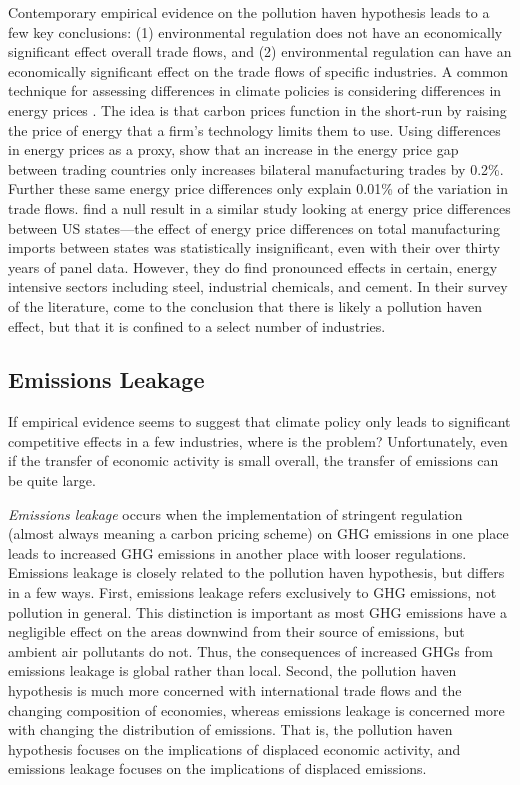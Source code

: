 Contemporary empirical evidence on the pollution haven hypothesis leads to a few key conclusions: (1) environmental regulation does not have an economically significant effect overall trade flows, and (2) environmental regulation can have an economically significant effect on the trade flows of specific industries. A common technique for assessing differences in climate policies is considering differences in energy prices \citep[see for example][]{fowlie2022mitigating}. The idea is that carbon prices function in the short-run by raising the price of energy that a firm's technology limits them to use. Using differences in energy prices as a proxy, \cite{sato2015asymmetric} show that an increase in the energy price gap between trading countries only increases bilateral manufacturing trades by 0.2\%. Further these same energy price differences only explain 0.01\% of the variation in trade flows. \cite{aldy2015competitiveness} find a null result in a similar study looking at energy price differences between US states---the effect of energy price differences on total manufacturing imports between states was statistically insignificant, even with their over thirty years of panel data. However, they do find pronounced effects in certain, energy intensive sectors including steel, industrial chemicals, and cement. In their survey of the literature, \cite{dechezlepretre2020impacts} come to the conclusion that there is likely a pollution haven effect, but that it is confined to a select number of industries.

\subsection{Emissions Leakage}

If empirical evidence seems to suggest that climate policy only leads to significant competitive effects in a few industries, where is the problem? Unfortunately, even if the transfer of economic activity is small overall, the transfer of emissions can be quite large.

\emph{Emissions leakage} occurs when the implementation of stringent regulation (almost always meaning a carbon pricing scheme) on GHG emissions in one place leads to increased GHG emissions in another place with looser regulations. Emissions leakage is closely related to the pollution haven hypothesis, but differs in a few ways. First, emissions leakage refers exclusively to GHG emissions, not pollution in general. This distinction is important as most GHG emissions have a negligible effect on the areas downwind from their source of emissions, but ambient air pollutants do not. Thus, the consequences of increased GHGs from emissions leakage is global rather than local. Second, the pollution haven hypothesis is much more concerned with international trade flows and the changing composition of economies, whereas emissions leakage is concerned more with changing the distribution of emissions. That is, the pollution haven hypothesis focuses on the implications of displaced economic activity, and emissions leakage focuses on the implications of displaced emissions.

